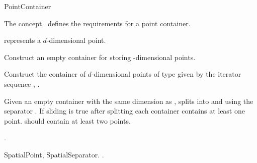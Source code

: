 

\begin{ccRefConcept}{PointContainer}


\ccDefinition
  
The concept \ccRefName\ defines the requirements for
a point container. 

\ccTypes

 represents a $d$-dimensional point.


\ccCreation
{}  %

{
Construct an empty container for storing -dimensional points.
}

{
Construct the container of $d$-dimensional points of type 
given by the iterator sequence , .
}

\ccOperations

{Given an empty container  with the same dimension as , splits  into
 and  using the separator . If sliding is true after splitting 
each container contains at least one point.  should contain at least two points.}

\ccHasModels

.

\ccSeeAlso

SpatialPoint, SpatialSeparator.
.

\end{ccRefConcept}



